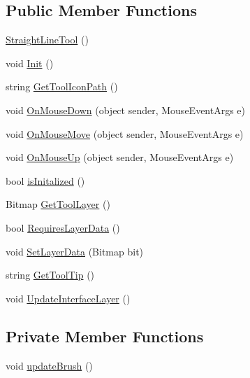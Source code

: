 \subsection*{Public Member Functions}
\begin{DoxyCompactItemize}
\item 
\mbox{\hyperlink{class_paint___program_1_1_straight_line_tool_a4e09ab9bf0ef819ed906bfe82d9b76cf}{Straight\+Line\+Tool}} ()
\item 
void \mbox{\hyperlink{class_paint___program_1_1_straight_line_tool_a4c3cce5f1141100f04ed3a653d6936a1}{Init}} ()
\item 
string \mbox{\hyperlink{class_paint___program_1_1_straight_line_tool_ae260a0f50ea86b9ae9cceb36d1093057}{Get\+Tool\+Icon\+Path}} ()
\item 
void \mbox{\hyperlink{class_paint___program_1_1_straight_line_tool_a75f5c2ed8c11fef038f458324e1213f2}{On\+Mouse\+Down}} (object sender, Mouse\+Event\+Args e)
\item 
void \mbox{\hyperlink{class_paint___program_1_1_straight_line_tool_ad76feea781f953b41a22a940b1f12716}{On\+Mouse\+Move}} (object sender, Mouse\+Event\+Args e)
\item 
void \mbox{\hyperlink{class_paint___program_1_1_straight_line_tool_ab823dd700a2a92df78fe73b25c129c14}{On\+Mouse\+Up}} (object sender, Mouse\+Event\+Args e)
\item 
bool \mbox{\hyperlink{class_paint___program_1_1_straight_line_tool_aa4fa3f224adf151dd9dbbb97282cc989}{is\+Initalized}} ()
\item 
Bitmap \mbox{\hyperlink{class_paint___program_1_1_straight_line_tool_adb914fa4551bfee82d074838032d030b}{Get\+Tool\+Layer}} ()
\item 
bool \mbox{\hyperlink{class_paint___program_1_1_straight_line_tool_a27d923f2b23fbfa5e630af6d43c5e613}{Requires\+Layer\+Data}} ()
\item 
void \mbox{\hyperlink{class_paint___program_1_1_straight_line_tool_aaf03af3c789ac775fef1336c81c11a34}{Set\+Layer\+Data}} (Bitmap bit)
\item 
string \mbox{\hyperlink{class_paint___program_1_1_straight_line_tool_a1052069a81f2ba116bb27b3346b4030f}{Get\+Tool\+Tip}} ()
\item 
void \mbox{\hyperlink{class_paint___program_1_1_straight_line_tool_a42d3d814c74e317160779fbe9df3531b}{Update\+Interface\+Layer}} ()
\end{DoxyCompactItemize}
\subsection*{Private Member Functions}
\begin{DoxyCompactItemize}
\item 
void \mbox{\hyperlink{class_paint___program_1_1_straight_line_tool_a8069ecade0457152cb37ee7ea308f72d}{update\+Brush}} ()
\end{DoxyCompactItemize}
